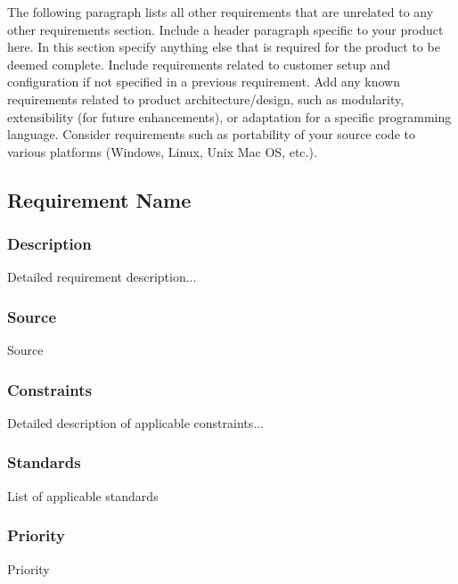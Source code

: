 The following paragraph lists all other requirements that are unrelated to any other requirements section.
Include a header paragraph specific to your product here. In this section specify anything else that is required for the product to be deemed complete. Include requirements related to customer setup and configuration if not specified in a previous requirement. Add any known requirements related to product architecture/design, such as modularity, extensibility (for future enhancements), or adaptation for a specific programming language. Consider requirements such as portability of your source code to various platforms (Windows, Linux, Unix Mac OS, etc.).

\subsection{Requirement Name}
\subsubsection{Description}
Detailed requirement description...
\subsubsection{Source}
Source
\subsubsection{Constraints}
Detailed description of applicable constraints...
\subsubsection{Standards}
List of applicable standards
\subsubsection{Priority}
Priority
